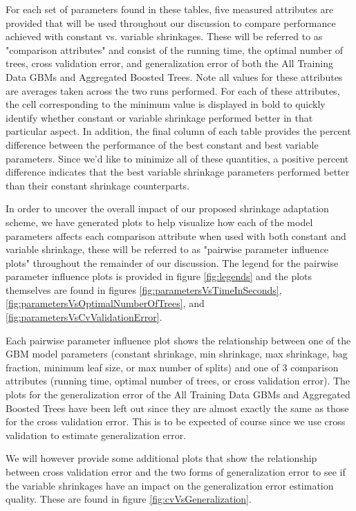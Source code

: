 \documentclass[9pt, conference]{IEEEtran}
\begin{document}
For each set of parameters found in these tables, five measured attributes are provided that will be used throughout our discussion to compare performance achieved with constant vs. variable shrinkages. These will be referred to as "comparison attributes" and consist of the running time, the optimal number of trees, cross validation error, and generalization error of both the All Training Data GBMs and Aggregated Boosted Trees. Note all values for these attributes are averages taken across the two runs performed. For each of these attributes, the cell corresponding to the minimum value is displayed in bold to quickly identify whether constant or variable shrinkage performed better in that particular aspect. In addition, the final column of each table provides the percent difference between the performance of the best constant and best variable parameters. Since we'd like to minimize all of these quantities, a positive percent difference indicates that the best variable shrinkage parameters performed better than their constant shrinkage counterparts. 

In order to uncover the overall impact of our proposed shrinkage adaptation scheme, we have generated plots to help visualize how each of the model parameters affects each comparison attribute when used with both constant and variable shrinkage, these will be referred to as "pairwise parameter influence plots" throughout the remainder of our discussion. The legend for the pairwise parameter influence plots is provided in figure \ref{fig:legends} and the plots themselves are found in figures
\ref{fig:parametersVsTimeInSeconds},
\ref{fig:parametersVsOptimalNumberOfTrees}, and
\ref{fig:parametersVsCvValidationError}.

Each pairwise parameter influence plot shows the relationship between one of the GBM model parameters (constant shrinkage, min shrinkage, max shrinkage, bag fraction, minimum leaf size, or max number of splits) and one of 3 comparison attributes (running time, optimal number of trees, or cross validation error). The plots for the generalization error of the All Training Data GBMs and Aggregated Boosted Trees have been left out since they are almost exactly the same as those for the cross validation error. This is to be expected of course since we use cross validation to estimate generalization error. 

We will however provide some additional plots that show the relationship between cross validation error and the two forms of generalization error to see if the variable shrinkages have an impact on the generalization error estimation quality. These are found in figure \ref{fig:cvVsGeneralization}.
\end{document}

